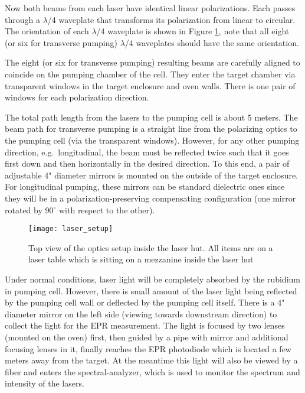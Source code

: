 Now both beams from each laser have identical linear
polarizations.  Each passes through a $\lambda$/4 waveplate that
transforms its polarization from linear to circular.  The orientation of 
each $\lambda$/4 waveplate is shown in Figure \ref{fig:laser_setup}, note that 
all eight (or six for transverse pumping) $\lambda$/4 waveplates should have 
the same orientation.

The eight (or six for transverse pumping)
resulting beams are carefully aligned to coincide on the pumping chamber 
of the cell.  They enter the target chamber via transparent
windows in the target enclosure and oven walls. There is one
pair of windows for each polarization direction.

The total path length from the lasers to the pumping cell is about 5
meters.  The beam path for transverse pumping is a straight line from
the polarizing optics to the pumping cell (via the transparent
windows).  However, for any other pumping direction, e.g.\
longitudinal, the beam must be reflected twice such that it goes first
down and then horizontally in the desired direction.  To this end, a
pair of adjustable 4" diameter mirrors is mounted on the outside of
the target enclosure.  For longitudinal pumping, these mirrors can be
standard dielectric ones since they will be in a
polarization-preserving compensating configuration (one mirror rotated
by 90$^\circ$ with respect to the other).  

\begin{figure}
\begin{center}
\centerline{\texttt{[image: laser\_setup]}}
\end{center}
\caption{Top view of the optics setup inside the laser hut. All items
are on a laser table
which is sitting on a mezzanine inside the laser hut}
\label{fig:laser_setup}
\end{figure}

Under normal conditions, laser light
will be completely absorbed by the rubidium in pumping cell.  
However, there is small amount of the laser light being reflected by 
the pumping cell wall or deflected by the pumping cell itself. 
There is a 4" diameter mirror on the left side (viewing
towards downstream direction) to collect the light for the EPR measurement.  
The light is focused by two lenses (mounted on the oven) first, then guided
by a pipe with mirror and additional focusing lenses in it, finally reaches 
the EPR photodiode which is located a few meters away from the target.
At the meantime this light will also be viewed by a fiber and enters 
the spectral-analyzer, which is used to monitor the spectrum and intensity of 
the lasers.

